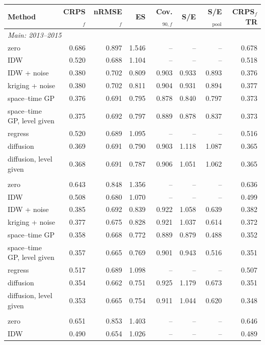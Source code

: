 \begin{tabular}{lrrrrrrr}
\toprule
Method & CRPS$_f$ & nRMSE$_f$ & ES & Cov.$_{90,f}$ & S/E & S/E$_\mathrm{pool}$ & CRPS$_f$ TR \\
\midrule
\multicolumn{8}{l}{\emph{Main: 2013--2015}} \\
zero & 0.686 & 0.897 & 1.546 & -- & -- & -- & 0.678 \\
IDW & 0.520 & 0.688 & 1.104 & -- & -- & -- & 0.518 \\
IDW + noise & 0.380 & 0.702 & 0.809 & 0.903 & 0.933 & 0.893 & 0.376 \\
kriging + noise & 0.380 & 0.702 & 0.811 & 0.904 & 0.931 & 0.894 & 0.377 \\
space--time GP & 0.376 & 0.691 & 0.795 & 0.878 & 0.840 & 0.797 & 0.373 \\
space--time GP, level given & 0.375 & 0.692 & 0.797 & 0.889 & 0.878 & 0.837 & 0.373 \\
regress & 0.520 & 0.689 & 1.095 & -- & -- & -- & 0.516 \\
diffusion & 0.369 & 0.691 & 0.790 & 0.903 & 1.118 & 1.087 & 0.365 \\
diffusion, level given & 0.368 & 0.691 & 0.787 & 0.906 & 1.051 & 1.062 & 0.365 \\
\addlinespace
\multicolumn{8}{l}{\emph{Sparse: 2016 on}} \\
zero & 0.643 & 0.848 & 1.356 & -- & -- & -- & 0.636 \\
IDW & 0.508 & 0.680 & 1.070 & -- & -- & -- & 0.499 \\
IDW + noise & 0.385 & 0.692 & 0.839 & 0.922 & 1.058 & 0.639 & 0.382 \\
kriging + noise & 0.377 & 0.675 & 0.828 & 0.921 & 1.037 & 0.614 & 0.372 \\
space--time GP & 0.358 & 0.668 & 0.772 & 0.889 & 0.879 & 0.488 & 0.352 \\
space--time GP, level given & 0.357 & 0.665 & 0.769 & 0.901 & 0.943 & 0.516 & 0.351 \\
regress & 0.517 & 0.689 & 1.098 & -- & -- & -- & 0.507 \\
diffusion & 0.354 & 0.662 & 0.751 & 0.925 & 1.179 & 0.673 & 0.351 \\
diffusion, level given & 0.353 & 0.665 & 0.754 & 0.911 & 1.044 & 0.620 & 0.348 \\
\addlinespace
\multicolumn{8}{l}{\emph{In-fit: 2009--2015}} \\
zero & 0.651 & 0.853 & 1.403 & -- & -- & -- & 0.646 \\
IDW & 0.490 & 0.654 & 1.026 & -- & -- & -- & 0.489 \\

\end{tabular}
